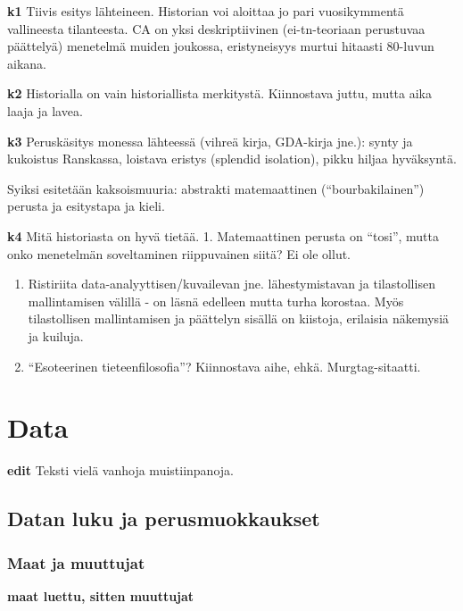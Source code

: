 \documentclass[
  finnish,
]{book}
\begin{document}
\textbf{k1} Tiivis esitys lähteineen. Historian voi aloittaa jo pari
vuosikymmentä vallineesta tilanteesta. CA on yksi deskriptiivinen
(ei-tn-teoriaan perustuvaa päättelyä) menetelmä muiden joukossa,
eristyneisyys murtui hitaasti 80-luvun aikana.

\textbf{k2} Historialla on vain historiallista merkitystä. Kiinnostava
juttu, mutta aika laaja ja lavea.

\textbf{k3} Peruskäsitys monessa lähteessä (vihreä kirja, GDA-kirja
jne.): synty ja kukoistus Ranskassa, loistava eristys (splendid
isolation), pikku hiljaa hyväksyntä.

Syiksi esitetään kaksoismuuria: abstrakti matemaattinen
(``bourbakilainen'') perusta ja esitystapa ja kieli.

\textbf{k4} Mitä historiasta on hyvä tietää. 1. Matemaattinen perusta on
``tosi'', mutta onko menetelmän soveltaminen riippuvainen siitä? Ei ole
ollut.

\begin{enumerate}
\def\labelenumi{\arabic{enumi}.}
\setcounter{enumi}{1}
\item
  Ristiriita data-analyyttisen/kuvailevan jne. lähestymistavan ja
  tilastollisen mallintamisen välillä - on läsnä edelleen mutta turha
  korostaa. Myös tilastollisen mallintamisen ja päättelyn sisällä on
  kiistoja, erilaisia näkemysiä ja kuiluja.
\item
  ``Esoteerinen tieteenfilosofia''? Kiinnostava aihe, ehkä.
  Murgtag-sitaatti.
\end{enumerate}

\hypertarget{data}{%
\chapter{Data}\label{data}}

\textbf{edit} Teksti vielä vanhoja muistiinpanoja.

\hypertarget{datan-luku-ja-perusmuokkaukset}{%
\section{Datan luku ja
perusmuokkaukset}\label{datan-luku-ja-perusmuokkaukset}}

\hypertarget{maat-ja-muuttujat}{%
\subsection{Maat ja muuttujat}\label{maat-ja-muuttujat}}

\textbf{maat luettu, sitten muuttujat}
\end{document}
